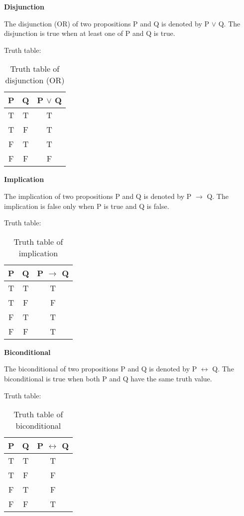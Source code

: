 \textbf{Disjunction}

The disjunction (OR) of two propositions P and Q is denoted by P $\lor$ Q.
The disjunction is true when at least one of P and Q is true.

Truth table:
\begin{table}[H]
    \centering
    \caption{Truth table of disjunction (OR)}
    \label{tab:truth_table_disjunction}
    \begin{tabular}{|c|c|c|}
        \hline
        P & Q & P $\lor$ Q \\
        \hline
        T & T & T          \\
        T & F & T          \\
        F & T & T          \\
        F & F & F          \\
        \hline
    \end{tabular}
\end{table}

\textbf{Implication}

The implication of two propositions P and Q is denoted by P $\rightarrow$ Q.
The implication is false only when P is true and Q is false.

Truth table:
\begin{table}[H]
    \centering
    \caption{Truth table of implication}
    \label{tab:truth_table_implication}
    \begin{tabular}{|c|c|c|}
        \hline
        P & Q & P $\rightarrow$ Q \\
        \hline
        T & T & T                 \\
        T & F & F                 \\
        F & T & T                 \\
        F & F & T                 \\
        \hline
    \end{tabular}
\end{table}

\textbf{Biconditional}

The biconditional of two propositions P and Q is denoted by P $\leftrightarrow$ Q.
The biconditional is true when both P and Q have the same truth value.

Truth table:
\begin{table}[H]
    \centering
    \caption{Truth table of biconditional}
    \label{tab:truth_table_biconditional}
    \begin{tabular}{|c|c|c|}
        \hline
        P & Q & P $\leftrightarrow$ Q \\
        \hline
        T & T & T                     \\
        T & F & F                     \\
        F & T & F                     \\
        F & F & T                     \\
        \hline
    \end{tabular}
\end{table}

